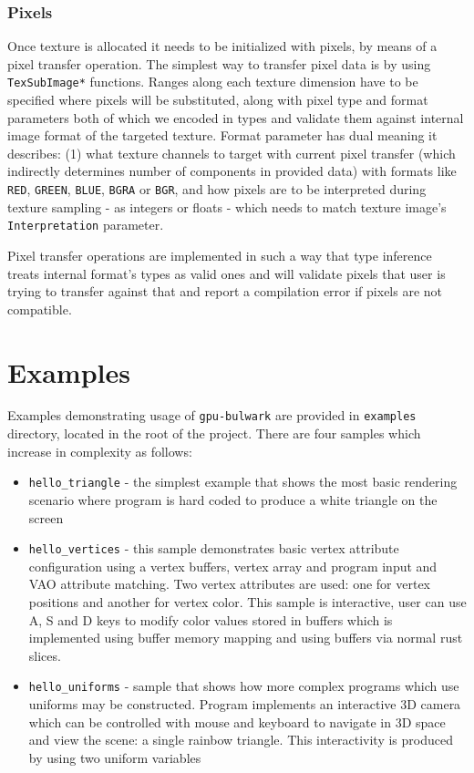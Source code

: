 \subsubsection{Pixels}

Once texture is allocated it needs to be initialized with pixels, by means of a pixel transfer operation.
The simplest way to transfer pixel data is by using \texttt{TexSubImage*} functions.
Ranges along each texture dimension have to be specified where pixels will be substituted,
along with pixel type and format parameters both of which we encoded in types and validate them 
against internal image format of the targeted texture.
Format parameter has dual meaning it describes: (1) what texture channels to target with current pixel transfer
(which indirectly determines number of components in provided data) with formats like \texttt{RED}, \texttt{GREEN}, \texttt{BLUE},
\texttt{BGRA} or \texttt{BGR}, and how pixels are to be interpreted during texture sampling - as integers or floats - which needs to match
texture image's \texttt{Interpretation} parameter.

Pixel transfer operations are implemented in such a way that type inference treats internal format's types
as valid ones and will validate pixels that user is trying to transfer against that and report a compilation error
if pixels are not compatible.

\section{Examples}

Examples demonstrating usage of \texttt{gpu-bulwark} are provided in \texttt{examples} directory, located in the root of the project.
There are four samples which increase in complexity as follows:
\begin{itemize}
    \item \texttt{hello\_triangle} - the simplest example that shows the most basic rendering scenario where program is hard coded to produce a white
        triangle on the screen
    \item \texttt{hello\_vertices} - this sample demonstrates basic vertex attribute configuration using a vertex buffers, 
        vertex array and program input and VAO attribute matching. 
        Two vertex attributes are used: one for vertex positions and another for vertex color.
        This sample is interactive, user can use A, S and D keys to modify color values stored in buffers 
        which is implemented using buffer memory mapping and using buffers via normal rust slices.
    \item \texttt{hello\_uniforms} - sample that shows how more complex programs which use uniforms may be constructed.
        Program implements an interactive 3D camera which can be controlled with mouse and keyboard to navigate in 3D space and
        view the scene: a single rainbow triangle. This interactivity is produced by using two uniform variables 

\end{itemize}